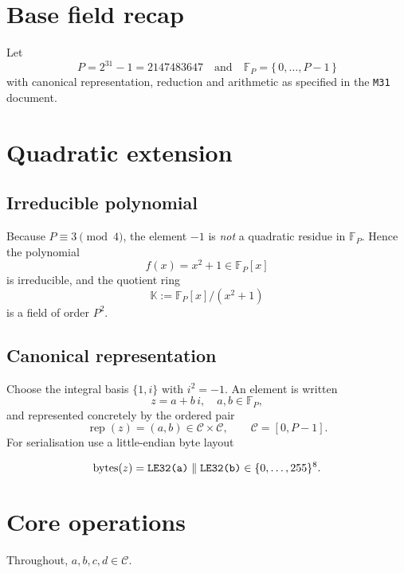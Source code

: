 \documentclass{article}
\begin{document}
\section{Base field recap}

Let
\[
   P = 2^{31}-1 = 2147483647
   \quad\text{and}\quad
   \mathbb{F}_{P} = \{\,0,\dots,P-1\,\}
\]
with canonical representation, reduction and arithmetic
as specified in the \texttt{M31} document.

\section{Quadratic extension}

\subsection{Irreducible polynomial}

Because \(P \equiv 3 \pmod 4\), the element \(-1\) is
\emph{not} a quadratic residue in \(\mathbb{F}_{P}\).  
Hence the polynomial
\[
   f(x)=x^{2}+1\in\mathbb{F}_{P}[x]
\]
is irreducible, and the quotient ring
\[
   \mathbb{K} := \mathbb{F}_{P}[x]/(x^{2}+1)
\]
is a field of order \(P^{2}\).

\subsection{Canonical representation}

Choose the integral basis \(\{1,i\}\) with \(i^{2}=-1\).
An element is written
\[
   z = a + b\,i,
   \quad a,b\in\mathbb{F}_{P},
\]
and represented concretely by the ordered pair
\[
   \operatorname{rep}(z) = (a,b)\in\mathcal{C}\times\mathcal{C},
   \qquad\mathcal{C}=[0,P-1].
\]
For serialisation use a little-endian byte layout

\[
   \text{bytes}(z)=\verb|LE32(a)|\;\Vert\;\verb|LE32(b)|\in\{0,\dots,255\}^{8}.
\]

\section{Core operations}

Throughout, \(a,b,c,d\in\mathcal{C}\).
\end{document}
